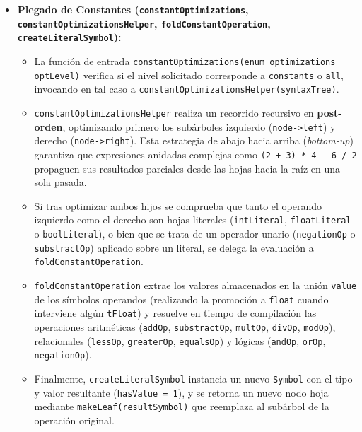 \documentclass[12pt, a4paper]{article}
\begin{document}
\begin{itemize}
    \item \textbf{Plegado de Constantes (\texttt{constantOptimizations}, \texttt{constant\allowbreak Optimizations\allowbreak Helper}, \texttt{fold\allowbreak Constant\allowbreak Operation}, \texttt{create\allowbreak Literal\allowbreak Symbol}):}
    \begin{itemize}
        \item La función de entrada \texttt{constantOptimizations(enum optimizations optLevel)} verifica si el nivel solicitado corresponde a \texttt{constants} o \texttt{all}, invocando en tal caso a \texttt{constantOptimizationsHelper(\allowbreak syntaxTree)}.
        \item \texttt{constantOptimizationsHelper} realiza un recorrido recursivo en \textbf{post-orden}, optimizando primero los subárboles izquierdo (\texttt{node->left}) y derecho (\texttt{node->right}). Esta estrategia de abajo hacia arriba (\textit{bottom-up}) garantiza que expresiones anidadas complejas como \texttt{(2 + 3) * 4 - 6 / 2} propaguen sus resultados parciales desde las hojas hacia la raíz en una sola pasada.
        \item Si tras optimizar ambos hijos se comprueba que tanto el operando izquierdo como el derecho son hojas literales (\texttt{intLiteral}, \texttt{floatLiteral} o \texttt{boolLiteral}), o bien que se trata de un operador unario (\texttt{negationOp} o \texttt{substractOp}) aplicado sobre un literal, se delega la evaluación a \texttt{foldConstantOperation}.
        \item \texttt{foldConstantOperation} extrae los valores almacenados en la unión \texttt{value} de los símbolos operandos (realizando la promoción a \texttt{float} cuando interviene algún \texttt{tFloat}) y resuelve en tiempo de compilación las operaciones aritméticas (\texttt{addOp}, \texttt{substractOp}, \texttt{multOp}, \texttt{divOp}, \texttt{modOp}), relacionales (\texttt{lessOp}, \texttt{greaterOp}, \texttt{equalsOp}) y lógicas (\texttt{andOp}, \texttt{orOp}, \texttt{negationOp}).
        \item Finalmente, \texttt{createLiteralSymbol} instancia un nuevo \texttt{Symbol} con el tipo y valor resultante (\texttt{hasValue = 1}), y se retorna un nuevo nodo hoja mediante \texttt{makeLeaf(\allowbreak resultSymbol)} que reemplaza al subárbol de la operación original.
    \end{itemize}


\end{itemize}
\end{document}
